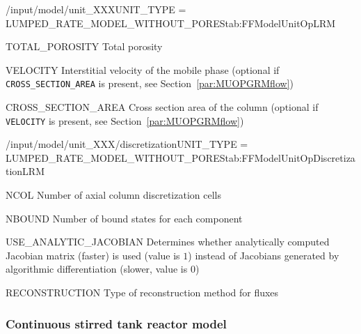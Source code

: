 \begin{condsubgroup}{/input/model/unit\_XXX}{UNIT\_TYPE = LUMPED\_RATE\_MODEL\_WITHOUT\_PORES}{tab:FFModelUnitOpLRM}
  \begin{dataset}[unit=--,type=double,range={$[0,1]$},length={1}]{TOTAL\_POROSITY}
    Total porosity
  \end{dataset}
  \begin{dataset}[unit=\si{\metre\per\second},type=double,range={$\mathds{R}$},length={1 / \texttt{NSEC}}]{VELOCITY}
    Interstitial velocity of the mobile phase (optional if \texttt{CROSS\_SECTION\_AREA} is present, see Section~\ref{par:MUOPGRMflow})
  \end{dataset}
  \begin{dataset}[unit=\si{\square\metre},type=double,range={$>0$},length={1}]{CROSS\_SECTION\_AREA}
    Cross section area of the column (optional if \texttt{VELOCITY} is present, see Section~\ref{par:MUOPGRMflow})
  \end{dataset}
\end{condsubgroup}

\begin{condsubgroup}{/input/model/unit\_XXX/discretization}{UNIT\_TYPE = LUMPED\_RATE\_MODEL\_WITHOUT\_PORES}{tab:FFModelUnitOpDiscretizationLRM}
  \begin{dataset}[type=int,range={$\geq 1$},length=1]{NCOL}
    Number of axial column discretization cells
  \end{dataset}
  \begin{dataset}[type=int,range={$\geq 0$},length={\texttt{NCOMP}}]{NBOUND}
    Number of bound states for each component
  \end{dataset}
  \begin{dataset}[type=int,range={$\{0, 1\}$},length=1]{USE\_ANALYTIC\_JACOBIAN}
    Determines whether analytically computed Jacobian matrix (faster) is used (value is $1$) instead of Jacobians generated by algorithmic differentiation (slower, value is $0$)
  \end{dataset}
  \begin{dataset}[type=string,range={\texttt{WENO}},length={1}]{RECONSTRUCTION}
    Type of reconstruction method for fluxes
  \end{dataset}
\end{condsubgroup}

\subsubsection{Continuous stirred tank reactor model}

